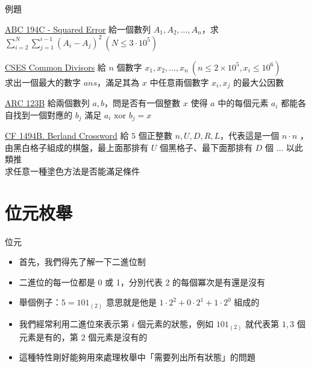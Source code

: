 \documentclass[aspectratio=169]{beamer}
\begin{document}
    \begin{frame}{例題}
        \begin{block}{\href{https://atcoder.jp/contests/abc194/tasks/abc194_c}{ABC 194C - Squared Error}}
            給一個數列 $A_1, A_2, \dots, A_n$，求 $\displaystyle\sum_{i = 2}^{N}{\sum_{j = 1}^{i - 1}{(A_i - A_j) ^ 2}}\ (N \le 3 \cdot 10^5)$
        \end{block}

        \begin{block}{\href{https://cses.fi/problemset/task/1081}{CSES Common Divisors}}
            給 $n$ 個數字 $x_1, x_2, \dots , x_n\ (n \le 2 \times 10^5, x_i \le 10^6)$\\
            求出一個最大的數字 $ans$，滿足其為 $x$ 中任意兩個數字 $x_i, x_j$ 的最大公因數
        \end{block}

        \begin{block}{\href{https://atcoder.jp/contests/arc124/tasks/arc124_b}{ARC 123B}}
            給兩個數列 $a, b$，問是否有一個整數 $x$ 使得 $a$ 中的每個元素 $a_i$ 都能各自找到一個對應的 $b_j$ 滿足 $a_i \text{ xor } b_j = x$
        \end{block}

        \begin{block}{\href{https://codeforces.com/problemset/problem/1494/B}{CF 1494B. Berland Crossword}}
            給 $5$ 個正整數 $n, U, D, R, L$，代表這是一個 $n \cdot n$ ，由黑白格子組成的棋盤，最上面那排有 $U$ 個黑格子、最下面那排有 $D$ 個 $\dots$ 以此類推\\
            求任意一種塗色方法是否能滿足條件
        \end{block}
        
        
    \end{frame}

    \section{位元枚舉}

    \begin{frame}{位元}
        \begin{itemize}
            \item<1-> 首先，我們得先了解一下二進位制
            \item<1-> 二進位的每一位都是 0 或 1，分別代表 2 的每個冪次是有還是沒有
            \item<1-> 舉個例子：$5 = 101_{(2)}$ 意思就是他是 $1 \cdot 2^2 + 0 \cdot 2^1 + 1 \cdot 2^0$ 組成的
            \item<2-> 我們經常利用二進位來表示第 $i$ 個元素的狀態，例如 $101_{(2)}$ 就代表第 $1, 3$ 個元素是有的，第 $2$ 個元素是沒有的
            \item<2-> 這種特性剛好能夠用來處理枚舉中「需要列出所有狀態」的問題
        \end{itemize}
    \end{frame}
\end{document}
